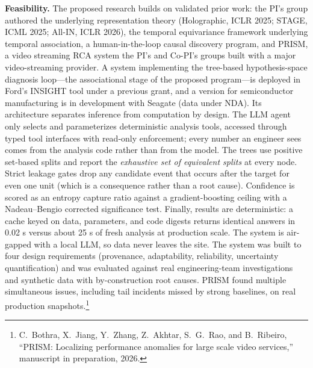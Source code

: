 \documentclass[12pt]{article}
\begin{document}
\textbf{Feasibility.} The proposed research builds on validated prior work: the PI's group authored the underlying representation theory (Holographic, ICLR 2025; STAGE, ICML 2025; All-IN, ICLR 2026), the temporal equivariance framework underlying temporal association, a human-in-the-loop causal discovery program, and PRISM, a video streaming RCA system the PI's and Co-PI's groups built with a major video-streaming provider. A system implementing the tree-based hypothesis-space diagnosis loop---the associational stage of the proposed program---is deployed in Ford's INSIGHT tool under a previous grant, and a version for semiconductor manufacturing is in development with Seagate (data under NDA). Its architecture separates inference from computation by design. The LLM agent only selects and parameterizes deterministic analysis tools, accessed through typed tool interfaces with read-only enforcement; every number an engineer sees comes from the analysis code rather than from the model. The trees use positive set-based splits and report the \emph{exhaustive set of equivalent splits} at every node. Strict leakage gates drop any candidate event that occurs after the target for even one unit (which is a consequence rather than a root cause). Confidence is scored as an entropy capture ratio against a gradient-boosting ceiling with a Nadeau–Bengio corrected significance test. Finally, results are deterministic: a cache keyed on data, parameters, and code digests returns identical answers in 0.02 s versus about 25 s of fresh analysis at production scale. The system is air-gapped with a local LLM, so data never leaves the site. The system was built to four design requirements (provenance, adaptability, reliability, uncertainty quantification) and was evaluated against real engineering-team investigations and synthetic data with by-construction root causes. PRISM found multiple simultaneous issues, including tail incidents missed by strong baselines, on real production snapshots.\footnote{C.~Bothra, X.~Jiang, Y.~Zhang, Z.~Akhtar, S.~G.~Rao, and B.~Ribeiro, ``PRISM: Localizing performance anomalies for large scale video services,'' manuscript in preparation, 2026.}
\end{document}

